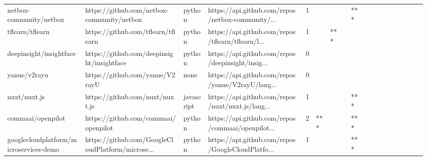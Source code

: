 \begin{tabular}{llllrlllllllllllll}
netbox-community/netbox                            &         https://github.com/netbox-community/netbox &            python &  https://api.github.com/repos/netbox-community/... &       1 &         &        &           &            *** &                 &        &           &           &          &          &       &              &          \\
tflearn/tflearn                                    &                 https://github.com/tflearn/tflearn &            python &  https://api.github.com/repos/tflearn/tflearn/l... &       1 &         &    *** &           &                &                 &        &           &           &          &          &       &              &          \\
deepinsight/insightface                            &         https://github.com/deepinsight/insightface &            python &  https://api.github.com/repos/deepinsight/insig... &       0 &         &        &           &                &                 &        &           &           &          &          &       &              &          \\
yanue/v2rayu                                       &                    https://github.com/yanue/V2rayU &              none &  https://api.github.com/repos/yanue/V2rayU/lang... &       0 &         &        &           &                &                 &        &           &           &          &          &       &              &          \\
nuxt/nuxt.js                                       &                    https://github.com/nuxt/nuxt.js &        javascript &  https://api.github.com/repos/nuxt/nuxt.js/lang... &       1 &         &        &           &            *** &                 &        &           &           &          &          &       &              &          \\
commaai/openpilot                                  &               https://github.com/commaai/openpilot &            python &  https://api.github.com/repos/commaai/openpilot... &       2 &     *** &        &           &            *** &                 &        &           &           &          &          &       &              &          \\
googlecloudplatform/microservices-demo             &  https://github.com/GoogleCloudPlatform/microse... &            python &  https://api.github.com/repos/GoogleCloudPlatfo... &       1 &         &        &           &            *** &                 &        &           &           &          &          &       &              &          \\

\end{tabular}
